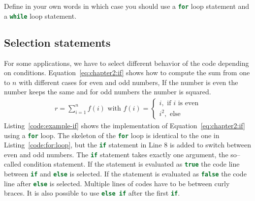 

\begin{exercise}
Define in your own words in which case you should use a \lstinline[language=C++]|for| loop statement and a \lstinline[language=C++]|while| loop statement. 
\end{exercise}

\subsection{Selection statements}
For some applications, we have to select different behavior of the code depending on conditions. Equation~\ref{eq:chapter2:if} shows how to compute the sum from one to $n$ with different cases for even and odd numbers, If the number is even the number keeps the same and for odd numbers the number is squared.
\begin{align}
r = \sum\limits_{i=1}^n f(i) \text{  with  } f(i) = 
\begin{cases}
i, \text{ if } i \text{ is even} \\
i^2, \text{ else}
\end{cases}
\label{eq:chapter2:if}
\end{align}
Listing~\ref{code:example-if} shows the implementation of Equation~\ref{eq:chapter2:if} using a \lstinline[language=c++]{for} loop. The skeleton of the \lstinline[language=c++]{for} loop is identical to the one in Listing~\ref{code:for:loop}, but the \lstinline[language=c++]{if} statement in Line 8 is added to switch between even and odd numbers. The \lstinline[language=c++]{if} statement takes exactly one argument, the so--called condition statement. If the statement is evaluated as \lstinline[language=c++]{true} the code line between \lstinline[language=c++]{if} and \lstinline[language=c++]{else} is selected.  If the statement is evaluated as \lstinline[language=c++]{false} the code line after \lstinline[language=c++]{else} is selected. Multiple lines of codes have to be between curly braces. It is also possible to use \lstinline[language=c++]{else if} after the first \lstinline[language=c++]{if}. \\

